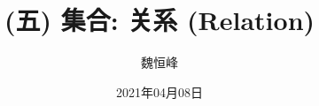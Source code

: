 \documentclass[]{beamer}
\title[(五) 关系 (Relation)]{(五) 集合: 关系 (Relation)}
\author[魏恒峰]{\large 魏恒峰}
\institute{hfwei@nju.edu.cn}
\date{2021年04月08日}
\begin{document}
\maketitle






\thankyou{}

\end{document}
